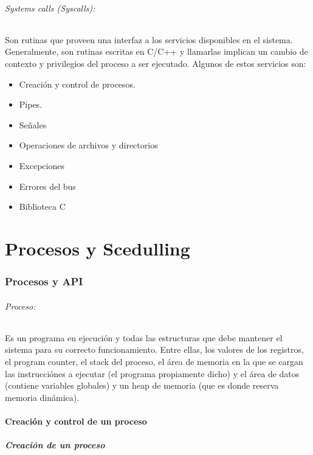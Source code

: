 \paragraph{Systems calls (Syscalls):} Son rutinas que proveen una interfaz a los servicios disponibles en el sistema. Generalmente, son rutinas escritas en C/C++ y llamarlas implican un cambio de contexto y privilegios del proceso a ser ejecutado. Algunos de estos servicios son:
\begin{itemize}
	\item Creación y control de procesos.
	\item Pipes.
	\item Señales
	\item Operaciones de archivos y directorios
	\item Excepciones
	\item Errores del bus
	\item Biblioteca C
\end{itemize}

\printbibliography[keyword=intro, title=Bibliografía]

\newpage
\part{Procesos y Scedulling}
\section{Procesos y API}
\paragraph{Proceso:} Es un programa en ejecución y todas las estructuras que debe mantener el sistema para su correcto funcionamiento. Entre ellas, los valores de los registros, el program counter, el stack del proceso, el área de memoria en la que se cargan las instrucciónes a  ejecutar (el programa propiamente dicho) y el área de datos (contiene variables globales) y un heap de memoria (que es donde reserva memoria dinámica).

\subsection{Creación y control de un proceso}
\subsubsection{Creación de un proceso}

